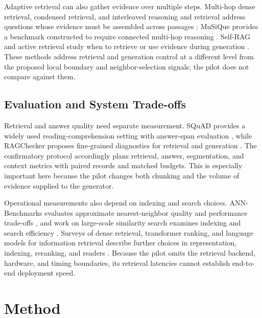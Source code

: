 \documentclass[10pt]{article}
\begin{document}
Adaptive retrieval can also gather evidence over multiple steps. Multi-hop dense retrieval, condensed retrieval, and interleaved reasoning and retrieval address questions whose evidence must be assembled across passages \cite{Xiong2020AnsweringComplex,Khattab2021BaleenRobust,Trivedi2022InterleavingRetrieval}; MuSiQue provides a benchmark constructed to require connected multi-hop reasoning \cite{Trivedi2021MusiqueMultihop}. Self-RAG and active retrieval study when to retrieve or use evidence during generation \cite{Asai2023SelfragLearning,Jiang2023ActiveRetrieval}. These methods address retrieval and generation control at a different level from the proposed local boundary and neighbor-selection signals; the pilot does not compare against them.

\subsection{Evaluation and System Trade-offs}

Retrieval and answer quality need separate measurement. SQuAD provides a widely used reading-comprehension setting with answer-span evaluation \cite{Rajpurkar2016Squad100000}, while RAGChecker proposes fine-grained diagnostics for retrieval and generation \cite{Ru2024RagcheckerFinegrained}. The confirmatory protocol accordingly plans retrieval, answer, segmentation, and context metrics with paired records and matched budgets. This is especially important here because the pilot changes both chunking and the volume of evidence supplied to the generator.

Operational measurements also depend on indexing and search choices. ANN-Benchmarks evaluates approximate nearest-neighbor quality and performance trade-offs \cite{Aumller2018AnnbenchmarksBenchmarking}, and work on large-scale similarity search examines indexing and search efficiency \cite{Johnson2017BillionscaleSimilarity}. Surveys of dense retrieval, transformer ranking, and language models for information retrieval describe further choices in representation, indexing, reranking, and readers \cite{Zhao2022DenseText,Yates2020PretrainedTransformers,Zhu2023LargeLanguage}. Because the pilot omits the retrieval backend, hardware, and timing boundaries, its retrieval latencies cannot establish end-to-end deployment speed.

\section{Method}
\end{document}
